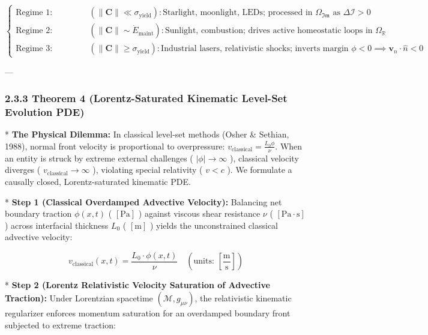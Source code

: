 \documentclass[11pt,a4paper]{article}
\theoremstyle{definition}
\theoremstyle{remark}
\begin{document}
\begin{equation}
\begin{cases}
\text{Regime 1: Informational Signal} & (\|\mathbf{C}\| \ll \sigma_{\text{yield}}): \text{Starlight, moonlight, LEDs; processed in } \Omega_{\mathfrak{Im}} \text{ as } \Delta \mathcal{I} > 0 \\
\text{Regime 2: Metabolic / Thermal} & (\|\mathbf{C}\| \sim \dot{E}_{\text{maint}}): \text{Sunlight, combustion; drives active homeostatic loops in } \Omega_{\mathbb{R}} \\
\text{Regime 3: Ablative / Fracture} & (\|\mathbf{C}\| \ge \sigma_{\text{yield}}): \text{Industrial lasers, relativistic shocks; inverts margin } \phi < 0 \implies \mathbf{v}_n \cdot \hat{n} < 0
\end{cases}
\end{equation}


---

\subsubsection{2.3.3 Theorem 4 (Lorentz-Saturated Kinematic Level-Set Evolution PDE)}
* \textbf{The Physical Dilemma:} In classical level-set methods (Osher \& Sethian, 1988), normal front velocity is proportional to overpressure: $v_{\text{classical}} = \frac{L_0 \phi}{\nu}$. When an entity is struck by extreme external challenges ( $|\phi| \to \infty$ ), classical velocity diverges ( $v_{\text{classical}} \to \infty$ ), violating special relativity ( $v < c$ ). We formulate a causally closed, Lorentz-saturated kinematic PDE.

* \textbf{Step 1 (Classical Overdamped Advective Velocity):}
Balancing net boundary traction $\phi(x, t)$ ( $[\mathrm{Pa}]$ ) against viscous shear resistance $\nu$ ( $[\mathrm{Pa \cdot s}]$ ) across interfacial thickness $L_0$ ( $[\mathrm{m}]$ ) yields the unconstrained classical advective velocity:


\begin{equation}
v_{\text{classical}}(x, t) = \frac{L_0 \cdot \phi(x, t)}{\nu} \quad \left( \text{units: } [\frac{\mathrm{m}}{\mathrm{s}}] \right)
\end{equation}


* \textbf{Step 2 (Lorentz Relativistic Velocity Saturation of Advective Traction):}
Under Lorentzian spacetime $(\mathcal{M}, g_{\mu\nu})$, the relativistic kinematic regularizer enforces momentum saturation for an overdamped boundary front subjected to extreme traction:
\end{document}
